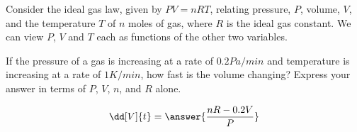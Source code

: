 \documentclass{ximera}
\author{David Guichard \and Neal Koblitz \and H. Jerome Keisler \and Albert Scheller \and Barry Balof \and Mike Wills \and Matthew Carr \and Bart Snapp}
\begin{document}
\begin{exercise}
Consider the ideal gas law, given by $PV=nRT$, relating pressure, $P$, volume, $V$, and the temperature $T$ of $n$ moles of gas, where $R$ is the ideal gas constant. We can view $P$, $V$ and $T$ each as functions of the other two variables. 

If the pressure of a gas is increasing at a rate of $0.2\unit{Pa/min}$ and temperature is increasing at a rate of $1\unit{K/min}$, how fast is the volume changing? Express your answer in terms of $P$, $V$, $n$, and $R$ alone.

\begin{prompt}
\[
\dd[V]{t}=\answer{\frac{n R-0.2 V}{P}}
\]
\end{prompt}

\end{exercise}
\end{document}
